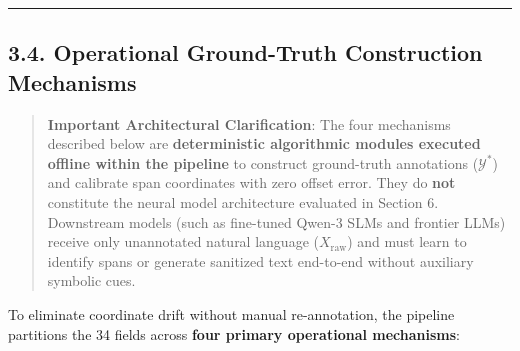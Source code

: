 \documentclass[
]{article}
\begin{document}
\begin{center}\rule{0.5\linewidth}{0.5pt}\end{center}

\subsection{3.4. Operational Ground-Truth Construction
Mechanisms}\label{operational-ground-truth-construction-mechanisms}

\begin{quote}
\textbf{Important Architectural Clarification}: The four mechanisms
described below are \textbf{deterministic algorithmic modules executed
offline within the pipeline} to construct ground-truth annotations
(\(\mathcal{Y}^*\)) and calibrate span coordinates with zero offset
error. They do \textbf{not} constitute the neural model architecture
evaluated in Section 6. Downstream models (such as fine-tuned Qwen-3
SLMs and frontier LLMs) receive only unannotated natural language
(\(X_{\text{raw}}\)) and must learn to identify spans or generate
sanitized text end-to-end without auxiliary symbolic cues.
\end{quote}

To eliminate coordinate drift without manual re-annotation, the pipeline
partitions the 34 fields across \textbf{four primary operational
mechanisms}:
\end{document}
